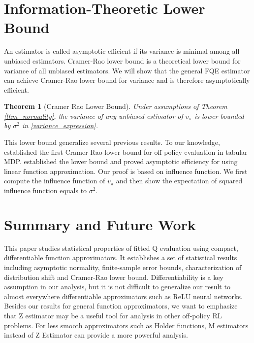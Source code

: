 \documentclass{article}
\numberwithin{equation}{section}
\theoremstyle{plain}
\newtheorem{theorem}{Theorem}[section]
\theoremstyle{definition}
\theoremstyle{remark}
\begin{document}
\section{Information-Theoretic Lower Bound}
An estimator is called asymptotic efficient if its variance is minimal among all unbiased estimators. Cramer-Rao lower bound is a theoretical lower bound for variance of all unbiased estimators. We will show that the general FQE estimator can achieve Cramer-Rao lower bound for variance and is therefore asymptotically efficient.

\begin{theorem}[Cramer Rao Lower Bound]\label{thm_CR}
    Under assumptions of Theorem \ref{thm_normality}, the variance of any unbiased estimator of $v_{\pi}$ is lower bounded by $\sigma^2$ in \eqref{variance_expression}.
\end{theorem}
This lower bound generalize several previous results. To our knowledge, \citep{JiangL15} established the first Cramer-Rao lower bound for off policy evaluation in tabular MDP. \citep{bootstrap} established the lower bound and proved asymptotic efficiency for using linear function approximation. Our proof is based on influence function. We first compute the influence function of $v_{\pi}$ and then show the expectation of squared influence function equals to $\sigma^2.$

\section{Summary and Future Work}

This paper studies statistical properties of fitted Q evaluation using compact, differentiable function approximators. It establishes a set of statistical results including asymptotic normality, finite-sample error bounds, characterization of distribution shift and Cramer-Rao lower bound. Differentiability is a key assumption in our analysis, but it is not difficult to generalize our result to almost everywhere differentiable approximators such as ReLU neural networks. Besides our results for general function approximators, we want to emphasize that Z estimator may be a useful tool for analysis in other off-policy RL problems. For less smooth approximators such as Holder functions, M estimators instead of Z Estimator can provide a more powerful analysis.
\newpage




\appendix
\onecolumn
\end{document}
